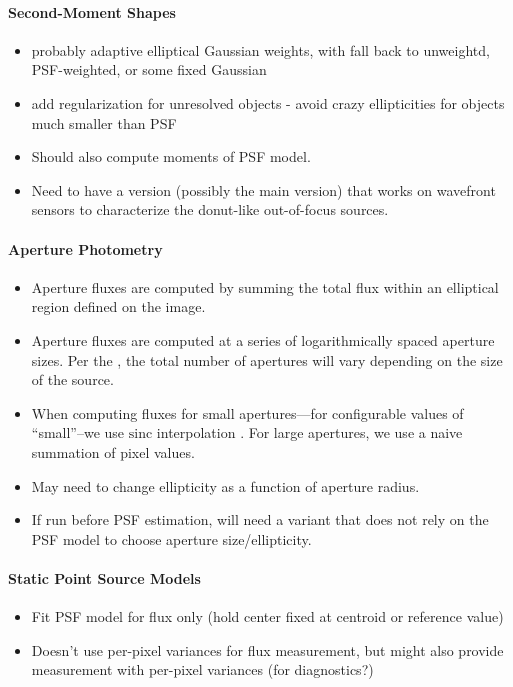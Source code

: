 \paragraph{Second-Moment Shapes}
\label{sec:acShapeAlgorithms}
\begin{itemize}
\item probably adaptive elliptical Gaussian weights, with fall back to unweightd, PSF-weighted, or some fixed Gaussian
\item add regularization for unresolved objects - avoid crazy ellipticities for objects much smaller than PSF
\item Should also compute moments of PSF model.
\item Need to have a version (possibly the main version) that works on wavefront sensors to characterize the donut-like out-of-focus sources.
\end{itemize}

\paragraph{Aperture Photometry}
\label{sec:acAperturePhotometry}

\begin{itemize}
\item Aperture fluxes are computed by summing the total flux within an elliptical region defined on the image.
\item Aperture fluxes are computed at a series of logarithmically spaced aperture sizes. Per the \DPDD{}, the total number of apertures will vary depending on the size of the source.
\item When computing fluxes for small apertures---for configurable values of ``small''--we use $\mathrm{sinc}$ interpolation \cite{Bickerton13}. For large apertures, we use a naive summation of pixel values.
\item May need to change ellipticity as a function of aperture radius.
\item If run before PSF estimation, will need a variant that does not rely on the PSF model to choose aperture size/ellipticity.
\end{itemize}

\paragraph{Static Point Source Models}
\label{sec:acStaticPointSourceModels}
\begin{itemize}
\item Fit PSF model for flux only (hold center fixed at centroid or reference value)
\item Doesn't use per-pixel variances for flux measurement, but might also provide measurement with per-pixel variances (for diagnostics?)
\end{itemize}

